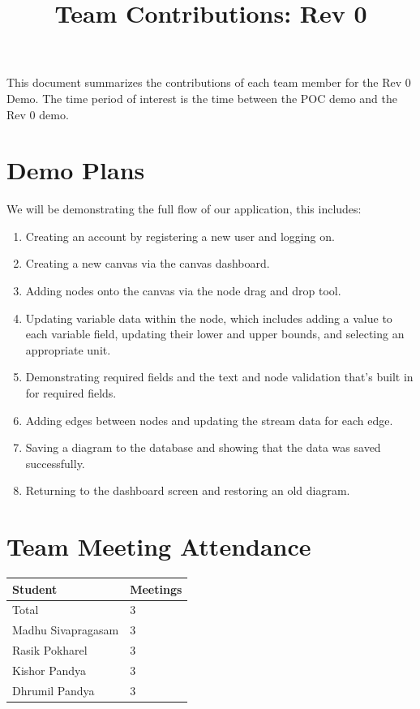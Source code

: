 \documentclass{article}
\title{Team Contributions: Rev 0\\\progname}
\author{\authname}
\date{}
\begin{document}
\maketitle

This document summarizes the contributions of each team member for the Rev 0
Demo.  The time period of interest is the time between the POC demo and the Rev
0 demo.

\section{Demo Plans}

We will be demonstrating the full flow of our application, this includes:
\begin{enumerate}
    \item Creating an account by registering a new user and logging on.
    \item Creating a new canvas via the canvas dashboard.
    \item Adding nodes onto the canvas via the node drag and drop tool.
    \item Updating variable data within the node, which includes adding a value to each variable field, updating their lower and upper bounds, and selecting an appropriate unit.
    \item Demonstrating required fields and the text and node validation that's built in for required fields.
    \item Adding edges between nodes and updating the stream data for each edge.
    \item Saving a diagram to the database and showing that the data was saved successfully.
    \item Returning to the dashboard screen and restoring an old diagram.
\end{enumerate}

\section{Team Meeting Attendance}


\begin{table}[H]
\centering
\begin{tabular}{ll}
\toprule
\textbf{Student} & \textbf{Meetings}\\
\midrule
Total & 3\\
Madhu Sivapragasam & 3\\
Rasik Pokharel & 3\\
Kishor Pandya & 3\\
Dhrumil Pandya & 3\\

\bottomrule
\end{tabular}
\end{table}
\end{document}
